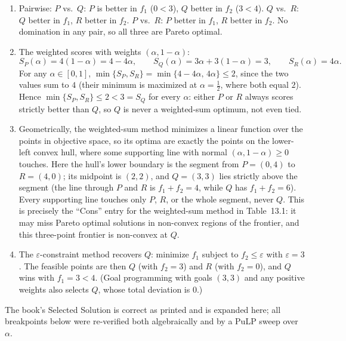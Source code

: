 \begin{enumerate}
\item Pairwise: $P$ vs.\ $Q$: $P$ is better in $f_1$ ($0 < 3$), $Q$ better
in $f_2$ ($3 < 4$). $Q$ vs.\ $R$: $Q$ better in $f_1$, $R$ better in $f_2$.
$P$ vs.\ $R$: $P$ better in $f_1$, $R$ better in $f_2$. No domination in any
pair, so all three are Pareto optimal.
\item The weighted scores with weights $(\alpha, 1-\alpha)$:
\[
S_P(\alpha) = 4(1-\alpha) = 4 - 4\alpha, \qquad
S_Q(\alpha) = 3\alpha + 3(1-\alpha) = 3, \qquad
S_R(\alpha) = 4\alpha.
\]
For any $\alpha \in [0,1]$,
$\min\{S_P, S_R\} = \min\{4 - 4\alpha, \, 4\alpha\} \leq 2$, since the two
values sum to $4$ (their minimum is maximized at $\alpha = \tfrac12$, where
both equal $2$). Hence $\min\{S_P, S_R\} \leq 2 < 3 = S_Q$ for every
$\alpha$: either $P$ or $R$ always scores strictly better than $Q$, so $Q$
is never a weighted-sum optimum, not even tied.
\item Geometrically, the weighted-sum method minimizes a linear function
over the points in objective space, so its optima are exactly the points on
the lower-left convex hull, where some supporting line with normal
$(\alpha, 1-\alpha) \geq 0$ touches. Here the hull's lower boundary is the
segment from $P = (0,4)$ to $R = (4,0)$; its midpoint is $(2,2)$, and $Q =
(3,3)$ lies strictly above the segment (the line through $P$ and $R$ is
$f_1 + f_2 = 4$, while $Q$ has $f_1 + f_2 = 6$). Every supporting line
touches only $P$, $R$, or the whole segment, never $Q$. This is precisely
the ``Cons'' entry for the weighted-sum method in Table~13.1: it may miss
Pareto optimal solutions in non-convex regions of the frontier, and this
three-point frontier is non-convex at $Q$.
\item The $\varepsilon$-constraint method recovers $Q$: minimize $f_1$
subject to $f_2 \leq \varepsilon$ with $\varepsilon = 3$. The feasible
points are then $Q$ (with $f_2 = 3$) and $R$ (with $f_2 = 0$), and $Q$ wins
with $f_1 = 3 < 4$. (Goal programming with goals $(3,3)$ and any positive
weights also selects $Q$, whose total deviation is $0$.)
\end{enumerate}


The book's Selected Solution is correct as printed and is expanded here;
all breakpoints below were re-verified both algebraically and by a PuLP
sweep over $\alpha$.

